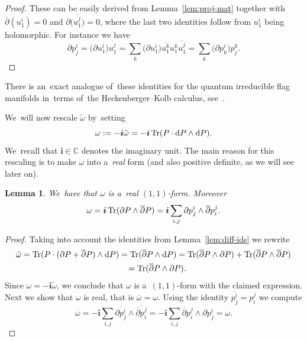 \documentclass[pdftex]{sigma}
\numberwithin{equation}{section}
\newtheorem{Lemma}[Theorem]{Lemma}
\newcommand{\diff}{\mathrm{d}}
\newcommand{\del}{\partial}
\newcommand{\delbar}{\overline{\partial}}
\newcommand{\bbC}{\mathbb{C}}
\newcommand{\iu}{\boldsymbol{i}}
\newcommand{\kafo}{\omega}
\newcommand{\kafot}{\tilde{\omega}}
\begin{document}
\begin{proof}
These can be easily derived from Lemma~\ref{lem:proj-mat} together with $\delbar(u^i_1) = 0$ and $\del\big(\overline{u^j_1}\big) = 0$, where the last two identities follow from $u^i_1$ being holomorphic. For instance we have
\[
\del p^i_j = \big(\del u^i_1\big) \overline{u^j_1} = \sum_k \big(\del u^i_1\big) \overline{u^k_1} u^k_1 \overline{u^j_1}
= \sum_k \big(\del p^i_k\big) p^k_j. \tag*{\qed}
\]
\renewcommand{\qed}{}
\end{proof}

\begin{Remark}
There is an~exact analogue of~these identities for the quantum irreducible flag manifolds in~terms of~the Heckenberger--Kolb calculus, see~\cite[Lemma 5.2]{mat-kahler}.
\end{Remark}

We~will now rescale $\kafot$ by~setting
\begin{equation}
\label{eq:kahler-form}
\kafo := - \iu \kafot = - \iu \mathop{\rm Tr}(P \cdot \diff P \wedge \diff P).
\end{equation}
We~recall that $\iu \in \bbC$ denotes the imaginary unit. The main reason for this rescaling is to make $\kafo$ into a~\emph{real} form (and also positive definite, as we will see later on).

\begin{Lemma}
We~have that $\kafo$ is a~real $(1, 1)$-form. Moreover
\[
\kafo = \iu \mathop{\rm Tr}(\del P \wedge \delbar P) = \iu \sum_{i, j} \del p^i_j \wedge \delbar p^j_i.
\]
\end{Lemma}

\begin{proof}
Taking into account the identities from Lemma~\ref{lem:diff-ids} we rewrite
\begin{gather*}
\kafot = \mathop{\rm Tr}(P \cdot (\del P + \delbar P) \wedge \diff P) = \mathop{\rm Tr}(\delbar P \wedge \diff P) = \mathop{\rm Tr}(\delbar P \wedge \del P) + \mathop{\rm Tr}(\delbar P \wedge \delbar P) \\ \phantom{\kafot}
{} = \mathop{\rm Tr}(\delbar P \wedge \del P).
\end{gather*}
Since $\kafo = - \iu \kafot$, we conclude that $\kafo$ is a~$(1, 1)$-form with the claimed expression.
Next we show that $\kafo$ is real, that is $\overline{\kafo} = \kafo$.
Using the identity $\overline{p^i_j} = p^j_i$ we compute
\[
\overline{\kafo} = - \iu \sum_{i, j} \overline{\del p^i_j} \wedge \overline{\delbar p^j_i}
= - \iu \sum_{i, j} \delbar p^j_i \wedge \del p^i_j = \kafo. \tag*{\qed}
\]
\renewcommand{\qed}{}
\end{proof}
\end{document}
